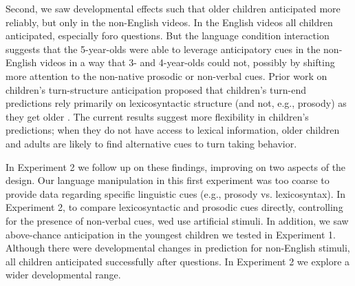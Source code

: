 \documentclass[authoryear, 12pt]{elsarticle}
\begin{document}
Second, we saw developmental effects such that older children anticipated more reliably, but only in the non-English videos. In the English videos all children anticipated, especially foro questions. But the language condition interaction suggests that the 5-year-olds were able to leverage anticipatory cues in the non-English videos in a way that 3- and 4-year-olds could not, possibly by shifting more attention to the non-native prosodic or non-verbal cues. Prior work on children's turn-structure anticipation proposed that children's turn-end predictions rely primarily on lexicosyntactic structure (and not, e.g., prosody) as they get older \citep{keitel2013}. The current results suggest more flexibility in children's predictions; when they do not have access to lexical information, older children and adults are likely to find alternative cues to turn taking behavior.

In Experiment 2 we follow up on these findings, improving on two aspects of the design. Our language manipulation in this first experiment was too coarse to provide data regarding specific linguistic cues (e.g., prosody vs. lexicosyntax). In Experiment 2, to compare lexicosyntactic and prosodic cues directly, controlling for the presence of non-verbal cues, wed use artificial stimuli. In addition, we saw above-chance anticipation in the youngest children we tested in Experiment 1. Although there were developmental changes in prediction for non-English stimuli, all children anticipated successfully after questions. In Experiment 2 we explore a wider developmental range.  


\end{document}
